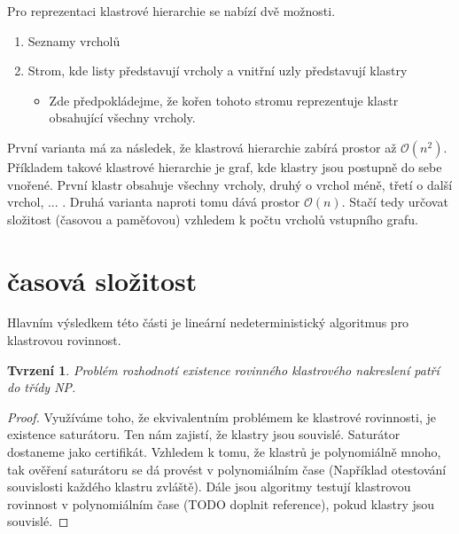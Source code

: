 \documentclass[12pt,a4report]{report}
\newtheorem{tvr2}{Tvrzení}
\begin{document}
Pro reprezentaci klastrové hierarchie se nabízí dvě možnosti.
\begin{enumerate}
\item Seznamy vrcholů
\item Strom, kde listy představují vrcholy a vnitřní uzly představují klastry
\begin{itemize}
\item Zde předpokládejme, že kořen tohoto stromu reprezentuje klastr obsahující všechny vrcholy.
\end{itemize}
\end{enumerate}

První varianta má za následek, že klastrová hierarchie zabírá prostor až $\mathcal{O}(n^2)$. Příkladem takové klastrové hierarchie je graf, kde klastry jsou postupně do sebe vnořené. První klastr obsahuje všechny vrcholy, druhý o vrchol méně, třetí o další vrchol, ... .
Druhá varianta naproti tomu dává prostor $\mathcal{O}(n)$. Stačí tedy určovat složitost (časovou a paměťovou) vzhledem k počtu vrcholů vstupního grafu.

\section{časová složitost}
Hlavním výsledkem této části je lineární nedeterministický algoritmus pro klastrovou rovinnost.
\begin{tvr2}
Problém rozhodnotí existence rovinného klastrového nakreslení patří do třídy NP.
\end{tvr2}
\begin{proof}
Využíváme toho, že ekvivalentním problémem ke klastrové rovinnosti, je existence saturátoru. Ten nám zajistí, že klastry jsou souvislé. Saturátor dostaneme jako certifikát. Vzhledem k tomu, že klastrů je polynomiálně mnoho, tak ověření saturátoru se dá provést  v polynomiálním čase (Například otestování souvislosti každého klastru zvláště). Dále jsou algoritmy testují klastrovou rovinnost v polynomiálním čase (TODO doplnit reference), pokud klastry jsou souvislé. 
\end{proof}
\end{document}
